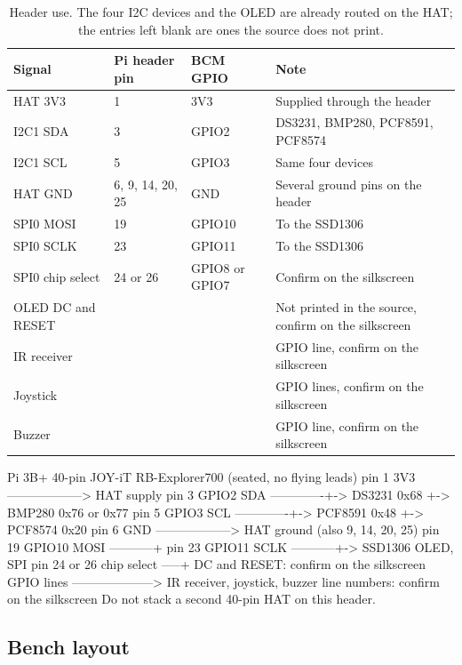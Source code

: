 \begin{table}[H]\centering\small
\begin{tabular}{p{40mm}p{26mm}p{22mm}p{58mm}}
\toprule
Signal & Pi header pin & BCM GPIO & Note \\
\midrule
HAT 3V3 & 1 & 3V3 & Supplied through the header \\
I2C1 SDA & 3 & GPIO2 & DS3231, BMP280, PCF8591, PCF8574 \\
I2C1 SCL & 5 & GPIO3 & Same four devices \\
HAT GND & 6, 9, 14, 20, 25 & GND & Several ground pins on the header \\
SPI0 MOSI & 19 & GPIO10 & To the SSD1306 \\
SPI0 SCLK & 23 & GPIO11 & To the SSD1306 \\
SPI0 chip select & 24 or 26 & GPIO8 or GPIO7 & Confirm on the silkscreen \\
OLED DC and RESET & & & Not printed in the source, confirm on the silkscreen \\
IR receiver & & & GPIO line, confirm on the silkscreen \\
Joystick & & & GPIO lines, confirm on the silkscreen \\
Buzzer & & & GPIO line, confirm on the silkscreen \\
\bottomrule
\end{tabular}
\caption{Header use. The four I2C devices and the OLED are already routed on the HAT; the entries left blank are ones the source does not print.}
\end{table}

\begin{asciiart}
Pi 3B+ 40-pin                    JOY-iT RB-Explorer700 (seated, no flying leads)
pin 1  3V3  ------------------>  HAT supply
pin 3  GPIO2 SDA -------------+-> DS3231   0x68
                              +-> BMP280   0x76 or 0x77
pin 5  GPIO3 SCL -------------+-> PCF8591  0x48
                              +-> PCF8574  0x20
pin 6  GND  ------------------>  HAT ground (also 9, 14, 20, 25)
pin 19 GPIO10 MOSI -----------+
pin 23 GPIO11 SCLK -----------+-> SSD1306 OLED, SPI
pin 24 or 26 chip select -----+   DC and RESET: confirm on the silkscreen
GPIO lines -------------------->  IR receiver, joystick, buzzer
                                  line numbers: confirm on the silkscreen
Do not stack a second 40-pin HAT on this header.
\end{asciiart}

\subsection*{Bench layout}


